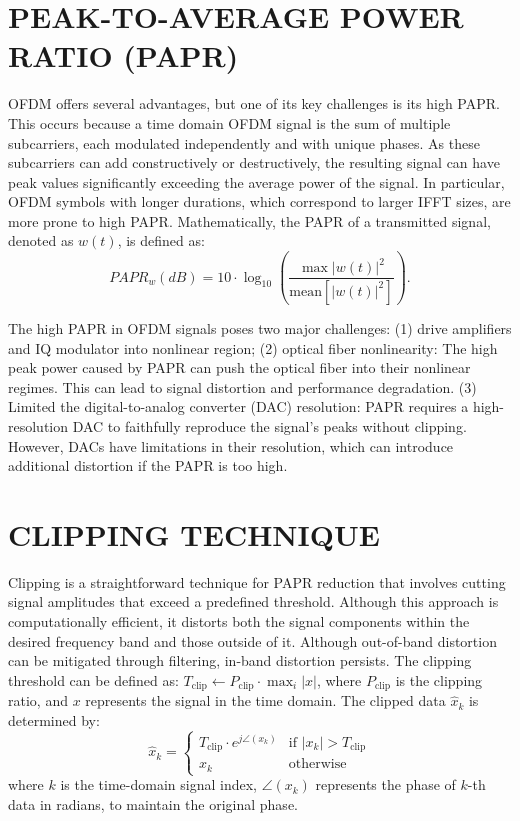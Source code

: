 \documentclass[conference]{IEEEtran}
\begin{document}
\section{PEAK-TO-AVERAGE POWER RATIO (PAPR)}
OFDM offers several advantages, but one of its key challenges is its high PAPR. This occurs because a time domain OFDM signal is the sum of multiple subcarriers, each modulated independently and with unique phases. As these subcarriers can add constructively or destructively, the resulting signal can have peak values significantly exceeding the average power of the signal. In particular, OFDM symbols with longer durations, which correspond to larger IFFT sizes, are more prone to high PAPR. Mathematically, the PAPR of a transmitted signal, denoted as $w(t)$, is defined as:
\begin{equation}
PAPR_w(dB) = 10 \cdot \log_{10} \left( \frac{\max |w(t)|^2}{\text{mean}[|w(t)|^2]} \right).
\end{equation}

The high PAPR in OFDM signals poses two major challenges: (1) drive amplifiers and IQ modulator into nonlinear region; (2) optical fiber nonlinearity: The high peak power caused by PAPR can push the optical fiber into their nonlinear regimes. This can lead to signal distortion and performance degradation. (3) Limited the digital-to-analog converter (DAC) resolution: PAPR requires a high-resolution DAC to faithfully reproduce the signal's peaks without clipping. However, DACs have limitations in their resolution, which can introduce additional distortion if the PAPR is too high.

\section{CLIPPING TECHNIQUE}
Clipping is a straightforward technique for PAPR reduction that involves cutting signal amplitudes that exceed a predefined threshold. Although this approach is computationally efficient, it distorts both the signal components within the desired frequency band and those outside of it. Although out-of-band distortion can be mitigated through filtering, in-band distortion persists. The clipping threshold can be defined as: $T_{\text{clip}} \leftarrow P_{\text{clip}} \cdot \max_i |x|$, where $P_{\text{clip}}$ is the clipping ratio, and $x$ represents the signal in the time domain. The clipped data $\hat{x}_k$ is determined by:
\begin{equation}
\hat{x}_k =
\begin{cases}
T_{\text{clip}} \cdot e^{j\angle(x_k)} & \text{if } |x_k| > T_{\text{clip}} \\
x_k & \text{otherwise}
\end{cases}
\end{equation}
where $k$ is the time-domain signal index, $\angle(x_k)$ represents the phase of $k$-th data in radians, to maintain the original phase.
\end{document}
